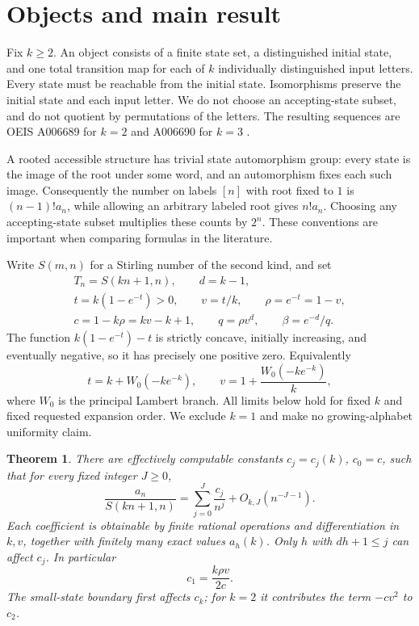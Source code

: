 \documentclass[11pt,letterpaper]{article}
\newtheorem{theorem}{Theorem}[section]
\theoremstyle{remark}\newtheorem{remark}[theorem]{Remark}
\numberwithin{equation}{section}
\begin{document}
\section{Objects and main result}\label{asa:acc:sec:objects}
Fix $k\ge2$. An object consists of a finite state set, a distinguished initial state, and one total transition map for each of $k$ individually distinguished input letters. Every state must be reachable from the initial state. Isomorphisms preserve the initial state and each input letter. We do not choose an accepting-state subset, and do not quotient by permutations of the letters. The resulting sequences are OEIS A006689 for $k=2$ and A006690 for $k=3$ \cite{oeis2,oeis3}.

A rooted accessible structure has trivial state automorphism group: every state is the image of the root under some word, and an automorphism fixes each such image. Consequently the number on labels $[n]$ with root fixed to $1$ is $(n-1)!a_n$, while allowing an arbitrary labeled root gives $n!a_n$. Choosing any accepting-state subset multiplies these counts by $2^n$. These conventions are important when comparing formulas in the literature.

Write $S(m,n)$ for a Stirling number of the second kind, and set
\begin{equation}\label{asa:acc:eq:constants}
\begin{gathered}
T_n=S(kn+1,n),\qquad d=k-1,\\
t=k(1-e^{-t})>0,\qquad v=t/k,\qquad \rho=e^{-t}=1-v,\\
c=1-k\rho=kv-k+1,\qquad q=\rho v^d,\qquad \beta=e^{-d}/q.
\end{gathered}
\end{equation}
The function $k(1-e^{-t})-t$ is strictly concave, initially increasing, and eventually negative, so it has precisely one positive zero. Equivalently
\[
t=k+W_0(-ke^{-k}),\qquad v=1+\frac{W_0(-ke^{-k})}{k},
\]
where $W_0$ is the principal Lambert branch. All limits below hold for fixed $k$ and fixed requested expansion order. We exclude $k=1$ and make no growing-alphabet uniformity claim.

\begin{theorem}\label{asa:acc:thm:main}
There are effectively computable constants $c_j=c_j(k)$, $c_0=c$, such that for every fixed integer $J\ge0$,
\begin{equation}\label{asa:acc:eq:main}
\frac{a_n}{S(kn+1,n)}=\sum_{j=0}^{J}\frac{c_j}{n^j}+O_{k,J}(n^{-J-1}).
\end{equation}
Each coefficient is obtainable by finite rational operations and differentiation in $k,v$, together with finitely many exact values $a_h(k)$. Only $h$ with $dh+1\le j$ can affect $c_j$. In particular
\begin{equation}\label{asa:acc:eq:c1}
c_1=\frac{k\rho v}{2c}.
\end{equation}
The small-state boundary first affects $c_k$; for $k=2$ it contributes the term $-cv^2$ to $c_2$.
\end{theorem}
\end{document}

